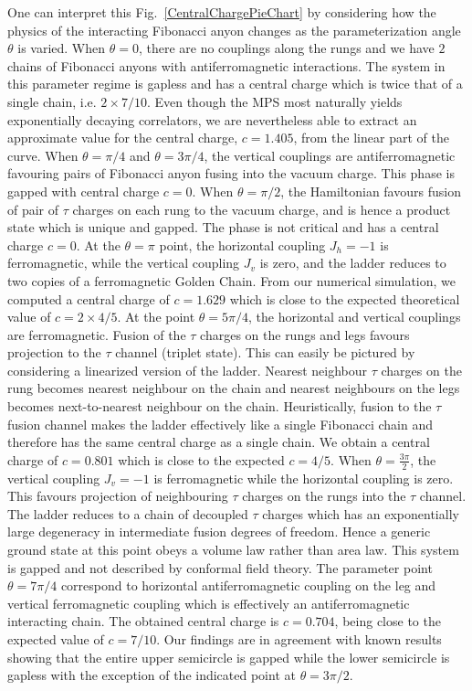 \documentclass[aps,reprint,superscriptaddress,amsmath,amssymb,amsfonts,prb]{revtex4-1}
\begin{document}
 One can interpret this Fig.~\ref{CentralChargePieChart} by considering how the physics of the interacting Fibonacci anyon changes as the parameterization angle $\theta$ is varied. When $\theta=0$, there are no couplings along the rungs and we have $2$ chains of Fibonacci anyons with antiferromagnetic interactions. The system in this parameter regime is gapless and has a central charge which is twice that of a single chain, i.e. $2 \times 7/10$. Even though the MPS most naturally yields exponentially decaying correlators, we are nevertheless able to extract an approximate value for the central charge, $c = 1.405$, from the linear part of the curve. When $\theta = \pi/4$ and $\theta = 3\pi/4$, the vertical couplings are antiferromagnetic favouring pairs of Fibonacci anyon fusing into the vacuum charge. This phase is gapped with central charge $c=0$. 
When $\theta=\pi/2$, the Hamiltonian favours fusion of pair of $\tau$ charges on each rung to the vacuum charge, and is hence a product state which is unique and gapped. The phase is not critical  and has a central charge $c=0$. At the $\theta=\pi$ point, the horizontal coupling $J_h=-1$ is ferromagnetic, while the vertical coupling $J_v$ is zero, and the ladder reduces to two copies of a ferromagnetic Golden Chain. From our numerical simulation, we computed a central charge of $c=1.629$ which is close to the expected theoretical value of $c=2\times 4/5$. At the point $\theta = 5\pi/4$, the horizontal and vertical couplings are ferromagnetic. Fusion of the $\tau$ charges on the rungs and legs favours projection to the $\tau$ channel (triplet state). This can easily be pictured by considering a linearized version of the ladder. Nearest neighbour $\tau$ charges on the rung becomes nearest neighbour on the chain and nearest neighbours on the legs becomes next-to-nearest neighbour on the chain.\cite{Trebst2008a} 
Heuristically, fusion to the $\tau$ fusion channel makes the ladder effectively like a single Fibonacci chain and therefore has the same central charge as a single chain. We obtain a central charge of $c=0.801$ which is close to the expected $c=4/5$. When $\theta=\frac{3\pi}{2}$, the vertical coupling $J_v = -1$ is ferromagnetic while the horizontal coupling is zero. This favours projection of neighbouring $\tau$ charges on the rungs into the $\tau$ channel. The ladder reduces to a chain of decoupled $\tau$ charges which has an exponentially large degeneracy in intermediate fusion degrees of freedom. Hence a generic ground state at this point obeys a volume law rather than area law. This system is gapped and not described by conformal field theory. The parameter point $\theta=7\pi/4$ correspond to horizontal antiferromagnetic coupling on the leg and vertical ferromagnetic coupling which is effectively an antiferromagnetic interacting chain. The obtained central charge is $c=0.704$, being close to the 
expected value of $c=7/10$. {Our findings are in agreement with known results showing that the entire upper semicircle is gapped while the lower semicircle is gapless} with the exception of the indicated point at $\theta=3\pi/2$. 
\end{document}
